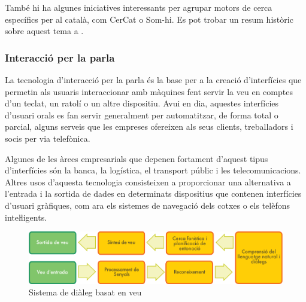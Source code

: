 \begin{multicols}{2}
També hi ha algunes iniciatives interessants per agrupar motors de cerca específics per al català, com CerCat o Som-hi\cite{CAT-cercadors}. Es pot trobar un resum històric sobre aquest tema a \cite{CAT-Resum-sobre-cercadors}.
  
\subsubsection{Interacció per la parla}

La tecnologia d’interacció per la parla és la base per a la creació d’interfícies que permetin als usuaris interaccionar amb màquines fent servir la veu en comptes d’un teclat, un ratolí o un altre dispositiu. Avui en dia, aquestes interfícies d’usuari orals es fan servir generalment per automatitzar, de forma total o parcial, alguns serveis que les empreses ofereixen als seus clients, treballadors i socis per via telefònica.

Algunes de les àrees empresarials que depenen fortament d’aquest tipus d’interfícies són la banca, la logística, el transport públic i les telecomunicacions. Altres usos d’aquesta tecnologia consisteixen a proporcionar una alternativa a l’entrada i la sortida de dades en determinats dispositius que contenen interfícies d’usuari gràfiques, com ara els sistemes de navegació dels cotxes o els telèfons inteŀligents. 

\begin{figure}[htb]
  \vspace{-9mm}
  \center  \includegraphics[width=\textwidth]{../_media/catalan/simple_speech-based_dialogue_architecture}
  \center
  \caption{Sistema de diàleg basat en veu}
  \label{fig:dialoguearch_ca}
\end{figure}


\end{multicols}
